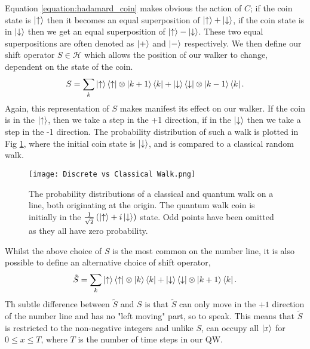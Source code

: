 Equation \ref{equation:hadamard_coin} makes obvious the action of $C$; if the coin state is $\ket{\uparrow}$ then it becomes an equal superposition of $\ket{\uparrow} + \ket{\downarrow}$, if the coin state is in $\ket{\downarrow}$ then we get an equal superposition of $\ket{\uparrow} - \ket{\downarrow}$. 
These two equal superpositions are often denoted as $\ket{+}$ and $\ket{-}$ respectively.\newline
We then define our shift operator $S \in \mathcal{H}$ which allows the position of our walker to change, dependent on the state of the coin.
\begin{equation}
    S = \sum_k \ket{\uparrow}\bra{\uparrow} \otimes \ket{k + 1}\bra{k} + \ket{\downarrow}\bra{\downarrow} \otimes \ket{k - 1}\bra{k}.
\end{equation}
Again, this representation of $S$ makes manifest its effect on our walker. 
If the coin is in the $\ket{\uparrow}$, then we take a step in the +1 direction, if in the $\ket{\downarrow}$ then we take a step in the -1 direction. 
The probability distribution of such a walk is plotted in Fig \ref{fig:discVSclass}, where the initial coin state is $\ket{\downarrow}$, and is compared to a classical random walk.\newline

\begin{figure}
    \centering
    \texttt{[image: Discrete vs Classical Walk.png]}
    \caption{The probability distributions of a classical and quantum walk on a line, both originating at the origin. The quantum walk coin is initially in the $\frac{1}{\sqrt{2}}\left(\ket{\uparrow} + i\ket{\downarrow}\right)$ state. Odd points have been omitted as they all have zero probability.}
    \label{fig:discVSclass}
\end{figure}

Whilst the above choice of $S$ is the most common on the number line, it is also possible to define an alternative choice of shift operator,
\begin{equation}
    \tilde{S} = \sum_k \ket{\uparrow}\bra{\uparrow} \otimes \ket{k}\bra{k} + \ket{\downarrow}\bra{\downarrow} \otimes \ket{k + 1}\bra{k}.
\end{equation}
Th subtle difference between $\tilde{S}$ and $S$ is that $\tilde{S}$ can only move in the $+1$ direction of the number line and has no "left moving" part, so to speak. 
This means that $\tilde{S}$ is restricted to the non-negative integers and unlike $S$, can occupy all $\ket{x}$ for $0\leq x\leq T$, where $T$ is the number of time steps in our QW.

\FloatBarrier